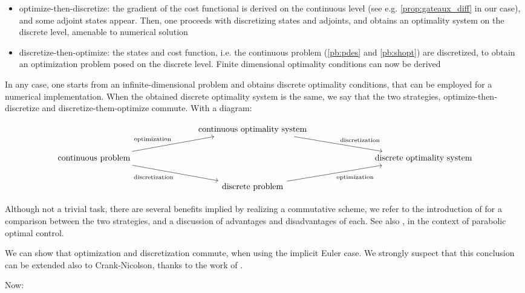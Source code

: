 \documentclass[english,a4paper,9pt,oneside]{scrbook}	%
\theoremstyle{break}
\theoremstyle{remark}
\begin{document}
\begin{itemize}
	\item optimize-then-discretize: the gradient of the cost functional is derived on the continuous level (see e.g. \cref{prop:gateaux_diff} in our case), and some adjoint states appear. Then, one proceeds with discretizing states and adjoints, and obtains an optimality system on the discrete level, amenable to numerical solution
	\item discretize-then-optimize: the states and cost function, i.e. the continuous problem (\cref{pb:pdes} and \cref{pb:shopt}) are discretized, to obtain an optimization problem posed on the discrete level. Finite dimensional optimality conditions can now be derived
\end{itemize}

In any case, one starts from an infinite-dimensional problem and obtains discrete optimality conditions, that can be employed for a numerical implementation. When the obtained discrete optimality system is the same, we say that the two strategies, optimize-then-discretize and discretize-them-optimize commute. With a diagram:

\[\begin{tikzcd}
	&&& \text{continuous optimality system} \\
	\text{continuous problem} &&&&&& \text{discrete optimality system}  \\
	&&& \text{discrete problem} 
	\arrow["{\text{optimization}}"', from=3-4, to=2-7]
	\arrow["{\text{discretization}}", from=1-4, to=2-7]
	\arrow["{\text{optimization}}", from=2-1, to=1-4]
	\arrow["{\text{discretization}}"', from=2-1, to=3-4]
\end{tikzcd}\]

Although not a trivial task, there are several benefits implied by realizing a commutative scheme, we refer to the introduction of \cite{liu} for a comparison between the two strategies, and a discussion of advantages and disadvantages of each. See also \cite{flaig}, in the context of parabolic optimal control.

We can show that optimization and discretization commute, when using the implicit Euler case. We strongly suspect that this conclusion can be extended also to Crank-Nicolson, thanks to the work of \cite{flaig}.

Now:
\end{document}
